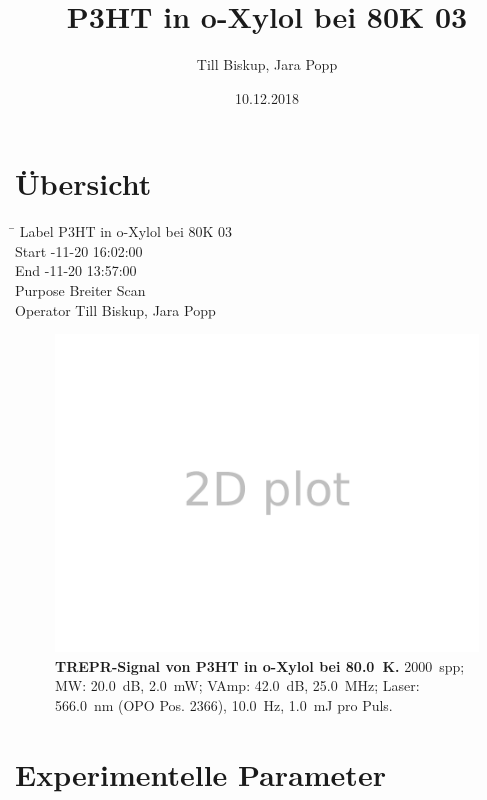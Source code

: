 \documentclass{article}
\begin{document}
\title{P3HT in o-Xylol bei 80K 03}
\author{Till Biskup, Jara Popp}
\date{10.12.2018}
\maketitle

\section*{Übersicht}

\begin{tabbing}
	\hspace{3.5cm} \= \kill
			Label \> P3HT in o-Xylol bei 80K 03
		\\
				Start -11-20 16:02:00
		\\
				End -11-20 13:57:00
		\\
				Purpose \> Breiter Scan
		\\
				Operator \> Till Biskup, Jara Popp
		\\
			\end{tabbing}

\begin{figure}[H]
	\includegraphics[width=\textwidth]{Plotter2D}
	\caption{\textbf{TREPR-Signal von P3HT in o-Xylol bei 80.0~K.} 2000~spp; MW: 20.0~dB, 2.0~mW; VAmp: 42.0~dB, 25.0~MHz; Laser: 566.0~nm (OPO Pos. 2366), 10.0~Hz, 1.0~mJ pro Puls.} 
\end{figure}

\clearpage
\section*{Experimentelle Parameter}
\end{document}
